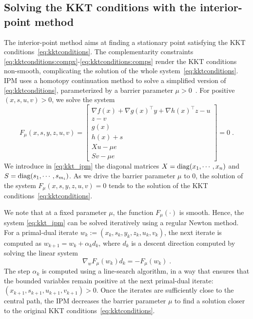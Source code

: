 \subsection{Solving the KKT conditions with the interior-point method}
\label{sec:ipm:kkt}
The interior-point method aims at finding a stationary point
satisfying the KKT conditions~\eqref{eq:kktconditions}.
The complementarity constraints \eqref{eq:kktconditions:compx}-\eqref{eq:kktconditions:comps}
render the KKT conditions non-smooth, complicating the solution of
the whole system~\eqref{eq:kktconditions}.
IPM uses a homotopy continuation method to solve a simplified
version of \eqref{eq:kktconditions}, parameterized by a barrier
parameter $\mu > 0$~\cite[Chapter 19]{nocedal_numerical_2006}.
For positive $(x, s, u, v) > 0$, we solve the system
\begin{equation}
  \label{eq:kkt_ipm}
  F_\mu(x, s, y, z, u, v) =
  \begin{bmatrix}
       \nabla f(x) + \nabla g(x)^\top y + \nabla h(x)^\top z - u  \\
       z - v  \\
       g(x)  \\
       h(x) + s  \\
       X u - \mu e  \\
       S v - \mu e
  \end{bmatrix} = 0
   \; .
\end{equation}
We introduce in \eqref{eq:kkt_ipm} the diagonal matrices $X = \operatorname{diag}(x_1, \cdots, x_n)$
and $S = \operatorname{diag}(s_1, \cdots, s_{m_i})$.
As we drive the barrier parameter $\mu$ to $0$, the solution of the
system $F_\mu(x, s, y, z, u, v) = 0$ tends to the solution of the
KKT conditions~\eqref{eq:kktconditions}.

We note that at a fixed parameter $\mu$, the function $F_\mu(\cdot)$
is smooth. Hence, the system \eqref{eq:kkt_ipm} can be solved iteratively
using a regular Newton method. For a primal-dual iterate
$w_k := (x_k, s_k, y_k, z_k, u_k, v_k)$, the next iterate is computed as
$w_{k+1} = w_k + \alpha_k d_k$, where $d_k$ is a descent
direction computed by solving the linear system
\begin{equation}
  \label{eq:newton_step}
  \nabla_w F_{\mu}(w_k) d_k = -F_{\mu}(w_k) \; .
\end{equation}
The step $\alpha_k$ is computed using a line-search algorithm, in a way
that ensures that the bounded variables remain positive
at the next primal-dual iterate: $(x_{k+1}, s_{k+1}, u_{k+1}, v_{k+1}) > 0$.
Once the iterates are sufficiently close to the central path,
the IPM decreases the barrier parameter $\mu$ to find a solution closer to
the original KKT conditions~\eqref{eq:kktconditions}.

